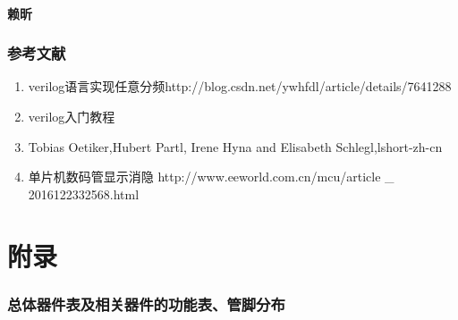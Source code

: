 \documentclass[a4paper,11pt]{ctexart}
\begin{document}
\subsection{赖昕}


\section{参考文献}

\begin{enumerate}
  \item verilog语言实现任意分频http://blog.csdn.net/ywhfdl/article/details/7641288
  \item verilog入门教程
  \item Tobias Oetiker,Hubert Partl, Irene Hyna and Elisabeth Schlegl,lshort-zh-cn
  \item 单片机数码管显示消隐 http://www.eeworld.com.cn/mcu/article \_ 2016122332568.html 
\end{enumerate}

\newpage
\appendix
\part{附录}
\section{总体器件表及相关器件的功能表、管脚分布}
\end{document}
